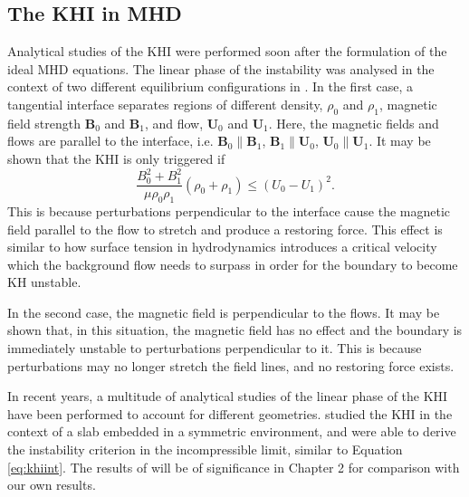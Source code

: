 
\subsection{The KHI in MHD}
\label{subsec:khimhd}

Analytical studies of the KHI were performed soon after the formulation of the ideal MHD equations.
The linear phase of the instability was analysed in the context of two different equilibrium configurations in \cite{Chandrasekhar1961}.
In the first case, a tangential interface separates regions of different density, $\rho_0$ and $\rho_1$, magnetic field strength $\mathbf{B}_0$ and $\mathbf{B}_1$, and flow, $\mathbf{U}_0$ and $\mathbf{U}_1$.
Here, the magnetic fields and flows are parallel to the interface, i.e. $\mathbf{B}_0 \parallel \mathbf{B}_1$, $\mathbf{B}_1 \parallel \mathbf{U}_0$, $\mathbf{U}_0 \parallel \mathbf{U}_1$.
It may be shown that the KHI is only triggered if
%
\begin{equation}
\label{eq:khiint}
\frac{B_0^2 + B_1^2}{\mu \rho_0 \rho_1} (\rho_0 + \rho_1) \leq (U_0 - U_1)^2.
\end{equation}
%
This is because perturbations perpendicular to the interface cause the magnetic field parallel to the flow to stretch and produce a restoring force.
This effect is similar to how surface tension in hydrodynamics introduces a critical velocity which the background flow needs to surpass in order for the boundary to become KH unstable.

In the second case, the magnetic field is perpendicular to the flows.
It may be shown that, in this situation, the magnetic field has no effect and the boundary is immediately unstable to perturbations perpendicular to it.
This is because perturbations may no longer stretch the field lines, and no restoring force exists.

In recent years, a multitude of analytical studies of the linear phase of the KHI have been performed to account for different geometries.
\cite{Nakariakov1995} studied the KHI in the context of a slab embedded in a symmetric environment, and were able to derive the instability criterion in the incompressible limit, similar to Equation \eqref{eq:khiint}.
The results of \cite{Nakariakov1995} will be of significance in Chapter 2 for comparison with our own results.

